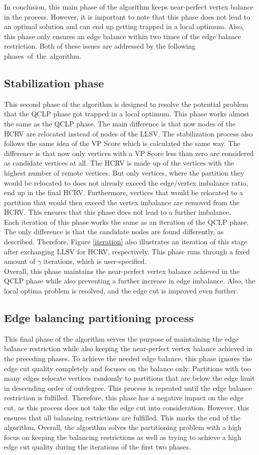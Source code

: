 \documentclass[acmsmall,nonacm,screen,review]{acmart}
\begin{document}
In conclusion, this main phase of the algorithm keeps near-perfect vertex balance in the process. However, it is important to note that this phase does not lead to an optimal solution and can end up getting trapped in a local optimum. Also, this phase only ensures an edge balance within two times of the edge balance restriction. Both of these issues are addressed by the following \hbox{phases of the algorithm.}
\subsection{Stabilization phase}
This second phase of the algorithm is designed to resolve the potential problem that the QCLP phase got trapped in a local optimum. This phase works almost the same as the QCLP phase. The main difference is that now nodes of the HCRV are relocated instead of nodes of the LLSV. The stabilization process also follows the same idea of the VP Score which is calculated the same way. The difference is that now only vertices with a VP Score less than zero are considered as candidate vertices at all. The HCRV is made up of the vertices with the highest number of remote vertices. But only vertices, where the partition they would be relocated to does not already exceed the edge/vertex imbalance ratio, end up in the final HCRV. Furthermore, vertices that would be relocated to a partition that would then exceed the vertex imbalance are removed from the HCRV. This ensures that this phase does not lead to a further imbalance. \\
Each iteration of this phase works the same as an iteration of the QCLP phase. The only difference is that the candidate nodes are found differently, as described. Therefore, Figure \ref{iteration} also illustrates an iteration of this stage after exchanging LLSV for HCRV, respectively. This phase runs through a fixed amount of $\gamma$ iterations, which is user-specified. \\
Overall, this phase maintains the near-perfect vertex balance achieved in the QCLP phase while also preventing a further increase in edge imbalance. Also, the local optima problem is resolved, and the edge cut is improved even further.
\subsection{Edge balancing partitioning process}
This final phase of the algorithm serves the purpose of maintaining the edge balance restriction while also keeping the near-perfect vertex balance achieved in the preceding phases. To achieve the needed edge balance, this phase ignores the edge cut quality completely and focuses on the balance only. Partitions with too many edges relocate vertices randomly to partitions that are below the edge limit in descending order of outdegree. This process is repeated until the edge balance restriction is fulfilled. Therefore, this phase has a negative impact on the edge cut, as this process does not take the edge cut into consideration. However, this ensures that all balancing restrictions are fulfilled. This marks the end of the algorithm. Overall, the algorithm solves the partitioning problem with a high focus on keeping the balancing restrictions as well as trying to achieve a high edge cut quality during the iterations of the first two phases.
\end{document}
